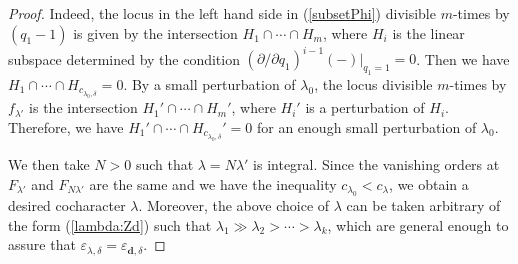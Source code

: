 \documentclass [11pt,oneside,a4paper,mathscr]{amsart}
\theoremstyle{definition}
\renewcommand{\leq}{\leqslant}
\newcommand{\X}{\mathscr{X}}
\begin{document}
\begin{proof}
Indeed, the locus in the left hand side in (\ref{subsetPhi}) 
divisible $m$-times by $(q_1-1)$ is given by 
the intersection $H_1 \cap \cdots \cap H_m$, 
where $H_i$
is the linear subspace determined by the condition 
$(\partial/\partial q_1)^{i-1}(-)|_{q_1=1}=0$. 
Then we have $H_1 \cap \cdots \cap H_{c_{\lambda_0, \delta}}=0$. 
By a small perturbation of $\lambda_0$, 
the locus divisible $m$-times by $f_{\lambda'}$ is the intersection $H_1' \cap \cdots \cap H_m'$,
where $H_i'$ is a perturbation of $H_i$. 
Therefore, we have $H_1' \cap \cdots \cap H_{c_{\lambda_0, \delta}}'=0$
for an enough small perturbation of $\lambda_0$. 

We then take $N>0$ such that $\lambda=N\lambda'$ is integral. 
Since the vanishing orders at $F_{\lambda'}$ and $F_{N\lambda'}$ are 
the same and we have the inequality $c_{\lambda_0}<c_{\lambda}$,
we obtain a desired cocharacter $\lambda$. 
Moreover, the above choice of $\lambda$ can be taken 
arbitrary of the form (\ref{lambda:Zd}) 
such that $\lambda_1\gg \lambda_2>\cdots>\lambda_k$, 
which are general enough to assure that
$\varepsilon_{\lambda, \delta}=\varepsilon_{\mathbf{d}, \delta}$. 

\end{proof}
\end{document}
